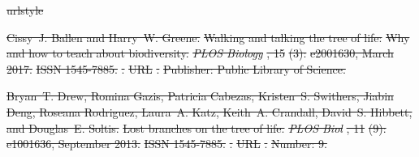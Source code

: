 \documentclass[oupdraft]{sysbio_sse}
\providecommand{\DIFdel}[1]{{\protect\color{red}\sout{#1}}}                      %
\providecommand{\DIFdelbegin}{} %
\begin{document}

\bigskip\bigskip

\DIFdelbegin %

\DIFdel{urlstyle}%

\DIFdel{Cissy~J. Ballen and Harry~W. Greene.
}%
\DIFdel{Walking and talking the tree of life: }%
\DIFdel{Why}%
\DIFdel{and how to teach about
  biodiversity.
}%
\emph{\DIFdel{PLOS Biology}}%
\DIFdel{, 15}%
\DIFdel{(3):}%
\DIFdel{e2001630, March 2017.
}%
\DIFdel{ISSN 1545-7885.
}%
\DIFdel{.
}%
\DIFdel{URL
  }%
\DIFdel{.
}%
\DIFdel{Publisher: Public Library of Science.
}%

\DIFdel{Bryan~T. Drew, Romina Gazis, Patricia Cabezas, Kristen~S. Swithers, Jiabin
  Deng, Roseana Rodriguez, Laura~A. Katz, Keith~A. Crandall, David~S. Hibbett,
  and Douglas~E. Soltis.
}%
\DIFdel{Lost branches on the tree of life.
}%
\emph{\DIFdel{PLOS Biol}}%
\DIFdel{, 11}%
\DIFdel{(9):}%
\DIFdel{e1001636, September 2013.
}%
\DIFdel{ISSN 1545-7885.
}%
\DIFdel{.
}%
\DIFdel{URL
  }%
\DIFdel{.
}%
\DIFdel{Number: 9.
}%
\end{document}

